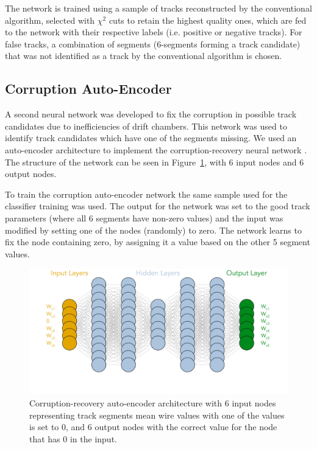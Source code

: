 The network is trained using a sample of tracks reconstructed by the conventional algorithm, selected with 
$\chi^2$ cuts to retain the highest quality ones, which are fed to the network with their respective labels 
(i.e. positive or negative tracks). For false tracks, a combination of segments (6-segments forming a track 
candidate) that was not identified as a track by the conventional algorithm is chosen.
 
 \subsection{Corruption Auto-Encoder}
 
A second neural network was developed to fix the corruption in possible track candidates due to 
inefficiencies of drift chambers. This network was used to identify track candidates which have one of 
the segments missing. We used an auto-encoder architecture to implement the corruption-recovery 
neural network \cite{Gavalian:2020xmc}. The structure of the network can be seen in 
Figure~\ref{autoencoder:architecture}, with 6 input nodes and 6 output nodes.

To train the corruption auto-encoder network the same sample used for the classifier training was used.
The output for the network was set to the good track parameters (where all 6 segments have non-zero values) 
and the input was modified by setting one of the nodes (randomly) to zero. The network learns to fix the node 
containing zero, by assigning it a value based on the other 5 segment values. 

 \begin{figure}[!ht]
\begin{center}

\includegraphics[width=4.5in]{images/aue_diagram.pdf}
\caption {Corruption-recovery auto-encoder architecture with 6 input nodes representing track segments 
mean wire values with one of the values is set to 0, and 6 output nodes with the correct value for the node 
that has 0 in the input. }
 \label{autoencoder:architecture}
 \end{center}
\end{figure}

